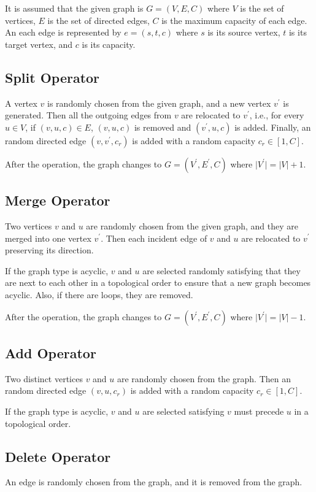\documentclass[a4paper, 10pt, conference]{ieeeconf}      %
\begin{document}
It is assumed that the given graph is $G = (V, E, C)$ where $V$ is the set of vertices, $E$ is the set of directed edges, $C$ is the maximum capacity of each edge. An each edge is represented by $e=(s, t, c)$ where $s$ is its source vertex, $t$ is its target vertex, and $c$ is its capacity.

\subsection{Split Operator}
A vertex $v$ is randomly chosen from the given graph, and a new vertex $v^{\prime}$ is generated. Then all the outgoing edges  from $v$ are relocated to $v^\prime$, i.e., for every $u \in V$, if $(v, u, c) \in E$, $(v, u, c)$ is removed and $(v^{\prime}, u, c)$ is added. Finally, an random directed edge $(v, v^{\prime}, c_r)$ is added with a random capacity $c_r \in [1, C]$.

After the operation, the graph changes to $G=(V^\prime, E^\prime, C)$ where $\vert V^\prime \vert = \vert V \vert + 1$.

\subsection{Merge Operator}
Two vertices $v$ and $u$ are randomly chosen from the given graph, and they are merged into one vertex $v^\prime$. Then each incident edge of $v$ and $u$ are relocated to $v^\prime$ preserving its direction.

If the graph type is acyclic, $v$ and $u$ are selected randomly satisfying that they are next to each other in a topological order to ensure that a new graph becomes acyclic. Also, if there are loops, they are removed.

After the operation, the graph changes to $G=(V^\prime, E^\prime, C)$ where $\vert V^\prime \vert = \vert V \vert - 1$.

\subsection{Add Operator}
Two distinct vertices $v$ and $u$ are randomly chosen from the graph. Then an random directed edge $(v, u, c_r)$ is added with a random capacity $c_r \in [1, C]$.

If the graph type is acyclic, $v$ and $u$ are selected satisfying $v$ must precede $u$ in a topological order.

\subsection{Delete Operator}
An edge is randomly chosen from the graph, and it is removed from the graph.
\end{document}
